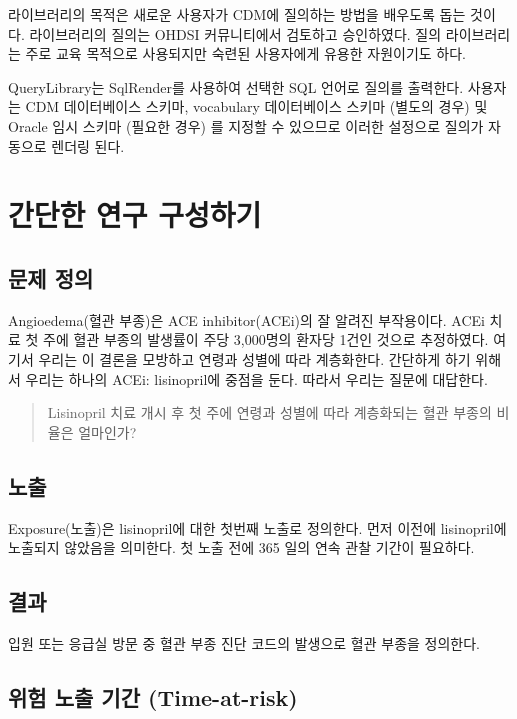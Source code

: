 \documentclass[11pt]{book}
\theoremstyle{definition}
\theoremstyle{definition}
\theoremstyle{definition}
\theoremstyle{remark}
\begin{document}
라이브러리의 목적은 새로운 사용자가 CDM에 질의하는 방법을 배우도록 돕는
것이다. 라이브러리의 질의는 OHDSI 커뮤니티에서 검토하고 승인하였다. 질의
라이브러리는 주로 교육 목적으로 사용되지만 숙련된 사용자에게 유용한
자원이기도 하다.

QueryLibrary는 SqlRender를 사용하여 선택한 SQL 언어로 질의를 출력한다.
사용자는 CDM 데이터베이스 스키마, vocabulary 데이터베이스 스키마 (별도의
경우) 및 Oracle 임시 스키마 (필요한 경우) 를 지정할 수 있으므로 이러한
설정으로 질의가 자동으로 렌더링 된다.

\section{간단한 연구 구성하기}\label{--}

\subsection{문제 정의}\label{-}

Angioedema(혈관 부종)은 ACE inhibitor(ACEi)의 잘 알려진 부작용이다.
\citep{slater_1988} ACEi 치료 첫 주에 혈관 부종의 발생률이 주당
3,000명의 환자당 1건인 것으로 추정하였다. 여기서 우리는 이 결론을
모방하고 연령과 성별에 따라 계층화한다. 간단하게 하기 위해서 우리는
하나의 ACEi: lisinopril에 중점을 둔다. 따라서 우리는 질문에 대답한다.

\begin{quote}
Lisinopril 치료 개시 후 첫 주에 연령과 성별에 따라 계층화되는 혈관
부종의 비율은 얼마인가?
\end{quote}

\subsection{노출}

Exposure(노출)은 lisinopril에 대한 첫번째 노출로 정의한다. 먼저 이전에
lisinopril에 노출되지 않았음을 의미한다. 첫 노출 전에 365 일의 연속 관찰
기간이 필요하다.

\subsection{결과}

입원 또는 응급실 방문 중 혈관 부종 진단 코드의 발생으로 혈관 부종을
정의한다.

\subsection{위험 노출 기간 (Time-at-risk)}\label{---time-at-risk}
\end{document}
